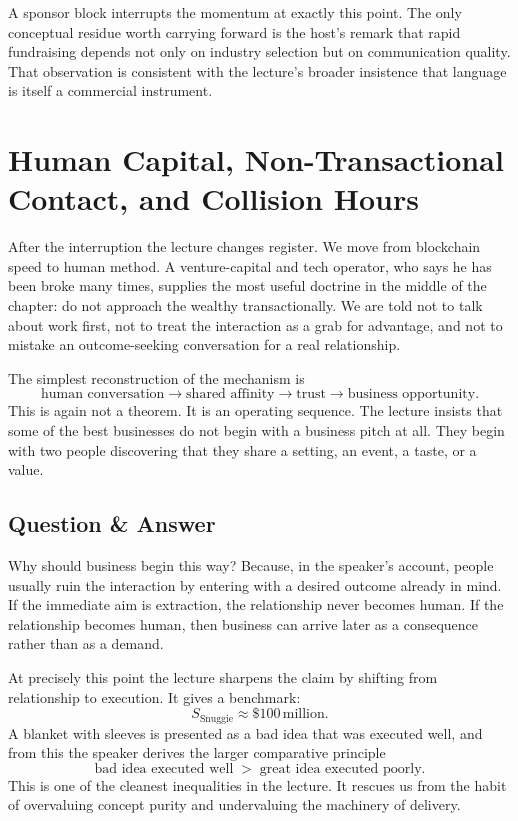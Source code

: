 A sponsor block interrupts the momentum at exactly this point. The only conceptual residue worth carrying forward is the host's remark that rapid fundraising depends not only on industry selection but on communication quality. That observation is consistent with the lecture's broader insistence that language is itself a commercial instrument.

\section{Human Capital, Non-Transactional Contact, and Collision Hours}

After the interruption the lecture changes register. We move from blockchain speed to human method. A venture-capital and tech operator, who says he has been broke many times, supplies the most useful doctrine in the middle of the chapter: do not approach the wealthy transactionally. We are told not to talk about work first, not to treat the interaction as a grab for advantage, and not to mistake an outcome-seeking conversation for a real relationship.

The simplest reconstruction of the mechanism is
\begin{equation}
\text{human conversation}
\to
\text{shared affinity}
\to
\text{trust}
\to
\text{business opportunity}.
\end{equation}
This is again not a theorem. It is an operating sequence. The lecture insists that some of the best businesses do not begin with a business pitch at all. They begin with two people discovering that they share a setting, an event, a taste, or a value.

\subsection{Question \& Answer}

Why should business begin this way? Because, in the speaker's account, people usually ruin the interaction by entering with a desired outcome already in mind. If the immediate aim is extraction, the relationship never becomes human. If the relationship becomes human, then business can arrive later as a consequence rather than as a demand.

At precisely this point the lecture sharpens the claim by shifting from relationship to execution. It gives a benchmark:
\begin{equation}
S_{\text{Snuggie}} \approx \$100\,\text{million}.
\end{equation}
A blanket with sleeves is presented as a bad idea that was executed well, and from this the speaker derives the larger comparative principle
\begin{equation}
\text{bad idea executed well}
\;>\;
\text{great idea executed poorly}.
\end{equation}
This is one of the cleanest inequalities in the lecture. It rescues us from the habit of overvaluing concept purity and undervaluing the machinery of delivery.


